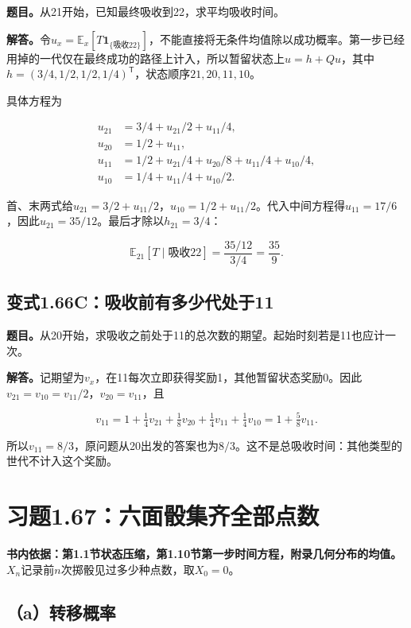 \documentclass[
  11pt,a4paper,UTF8,fontset=fandol]{ctexart}
\begin{document}
\textbf{题目。}从21开始，已知最终吸收到22，求平均吸收时间。

\textbf{解答。}令\(u_x=\mathbb E_x[T\mathbf1_{\{\text{吸收22}\}}]\)，不能直接将无条件均值除以成功概率。第一步已经用掉的一代仅在最终成功的路径上计入，所以暂留状态上\(u=h+Qu\)，其中\(h=(3/4,1/2,1/2,1/4)^{\mathsf T}\)，状态顺序\(21,20,11,10\)。

具体方程为

\[
\begin{aligned}
u_{21}&=3/4+u_{21}/2+u_{11}/4,\\
u_{20}&=1/2+u_{11},\\
u_{11}&=1/2+u_{21}/4+u_{20}/8+u_{11}/4+u_{10}/4,\\
u_{10}&=1/4+u_{11}/4+u_{10}/2.
\end{aligned}
\]

首、末两式给\(u_{21}=3/2+u_{11}/2\)，\(u_{10}=1/2+u_{11}/2\)。代入中间方程得\(u_{11}=17/6\)，因此\(u_{21}=35/12\)。最后才除以\(h_{21}=3/4\)：

\[\boxed{\mathbb E_{21}[T\mid\text{吸收22}]=\frac{35/12}{3/4}=\frac{35}{9}.}\]

\subsection{变式1.66C：吸收前有多少代处于11}\label{ux53d8ux5f0f1.66cux5438ux6536ux524dux6709ux591aux5c11ux4ee3ux5904ux4e8e11}

\textbf{题目。}从20开始，求吸收之前处于11的总次数的期望。起始时刻若是11也应计一次。

\textbf{解答。}记期望为\(v_x\)，在11每次立即获得奖励1，其他暂留状态奖励0。因此\(v_{21}=v_{10}=v_{11}/2\)，\(v_{20}=v_{11}\)，且

\[v_{11}=1+\tfrac14v_{21}+\tfrac18v_{20}+\tfrac14v_{11}+\tfrac14v_{10}
=1+\tfrac58v_{11}.\]

所以\(v_{11}=8/3\)，原问题从20出发的答案也为\(\boxed{8/3}\)。这不是总吸收时间：其他类型的世代不计入这个奖励。

\section{习题1.67：六面骰集齐全部点数}\label{ux4e60ux98981.67ux516dux9762ux9ab0ux96c6ux9f50ux5168ux90e8ux70b9ux6570}

\textbf{书内依据：第1.1节状态压缩，第1.10节第一步时间方程，附录几何分布的均值。}\(X_n\)记录前\(n\)次掷骰见过多少种点数，取\(X_0=0\)。

\subsection{（a）转移概率}\label{aux8f6cux79fbux6982ux7387-1}
\end{document}
